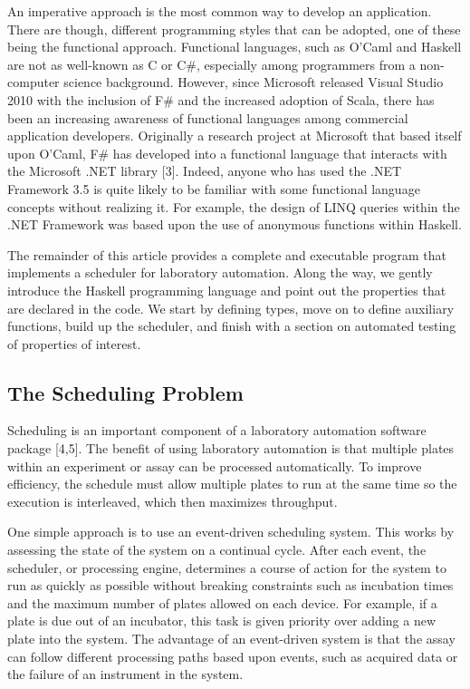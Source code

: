 \documentclass{article}
\begin{document}
An imperative approach is the most common way to develop an application. There are though, different programming styles that can be adopted, one of these being the functional approach.  Functional languages, such as O'Caml and Haskell are not as well-known as C or C\#, especially among programmers from a non-computer science background.  However, since Microsoft released Visual Studio 2010 with the inclusion of F\# and the increased adoption of Scala, there has been an increasing awareness of functional languages among commercial application developers.  Originally a research project at Microsoft that based itself upon O’Caml, F\# has developed into a functional language that interacts with the Microsoft .NET library [3]. Indeed, anyone who has used the .NET Framework 3.5 is quite likely to be familiar with some functional language concepts without realizing it.  For example, the design of LINQ queries within the .NET Framework was based upon the use of anonymous functions within Haskell.

The remainder of this article provides a complete and executable program that implements a scheduler for laboratory automation. Along the way, we gently introduce the Haskell programming language and point out the properties that are declared in the code. We start by defining types, move on to define auxiliary functions, build up the scheduler, and finish with a section on automated testing of properties of interest.


\subsection*{The Scheduling Problem}

Scheduling is an important component of a laboratory automation software package [4,5].  The benefit of using laboratory automation is that multiple plates within an experiment or assay can be processed automatically.  To improve efficiency, the schedule must allow multiple plates to run at the same time so the execution is interleaved, which then maximizes throughput.  

One simple approach is to use an event-driven scheduling system. This works by assessing the state of the system on a continual cycle. After each event, the scheduler, or processing engine, determines a course of action for the system to run as quickly as possible without breaking constraints such as incubation times and the maximum number of plates allowed on each device. For example, if a plate is due out of an incubator, this task is given priority over adding a new plate into the system. The advantage of an event-driven system is that the assay can follow different processing paths based upon events, such as acquired data or the failure of an instrument in the system.
\end{document}
